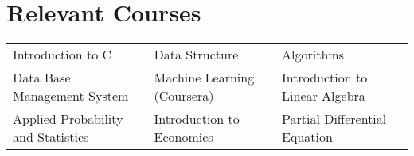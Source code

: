 \section*{Relevant Courses}
\begin{tabularx}{\textwidth}{X X X}
    Introduction to C &
    Data Structure &
    Algorithms \\
    Data Base Management System &
    Machine Learning (Coursera) &
    Introduction to Linear Algebra  \\
    Applied Probability and Statistics &
    Introduction to Economics &
    Partial Differential Equation
\end{tabularx}
